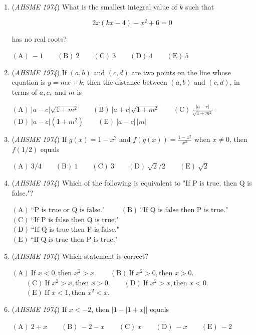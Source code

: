 \begin{enumerate}
	\item (\textit{AHSME 1974}) What is the smallest integral value of $k$ such that 


 
 \[2x(kx-4)-x^2+6=0\]


 has no real roots?


 $\mathrm{(A)\ } -1 \qquad \mathrm{(B) \ }2 \qquad \mathrm{(C) \  } 3 \qquad \mathrm{(D) \  } 4 \qquad \mathrm{(E) \  }5$


	\item (\textit{AHSME 1974}) If $(a, b)$ and $(c, d)$ are two points on the line whose equation is $y=mx+k$, then the distance between $(a, b)$ and $(c, d)$, in terms of $a, c,$ and $m$ is 


 $\mathrm{(A)\ } |a-c|\sqrt{1+m^2} \qquad \mathrm{(B) \ }|a+c|\sqrt{1+m^2} \qquad \mathrm{(C) \  } \frac{|a-c|}{\sqrt{1+m^2}} \qquad$
$\mathrm{(D) \  } |a-c|(1+m^2) \qquad \mathrm{(E) \  }|a-c|\,|m|$


	\item (\textit{AHSME 1974}) If $g(x)=1-x^2$ and $f(g(x))=\frac{1-x^2}{x^2}$ when $x\not=0$, then $f(1/2)$ equals 


 $\mathrm{(A)\ } 3/4 \qquad \mathrm{(B) \ }1 \qquad \mathrm{(C) \  } 3 \qquad \mathrm{(D) \  } \sqrt{2}/2 \qquad \mathrm{(E) \  }\sqrt{2}$


	\item (\textit{AHSME 1974}) Which of the following is equivalent to "If P is true, then Q is false."?


 $\mathrm{(A)\ } \text{``P is true or Q is false."} \qquad$
$\mathrm{(B) \ }\text{``If Q is false then P is true."} \qquad$
$\mathrm{(C) \  } \text{``If P is false then Q is true."} \qquad$
$\mathrm{(D) \  } \text{``If Q is true then P is false."} \qquad$
$\mathrm{(E) \  }\text{``If Q is true then P is true."} \qquad$


	\item (\textit{AHSME 1974}) Which statement is correct?


 $\mathrm{(A)\ } \text{If } x<0, \text{then } x^2>x. \qquad \mathrm{(B) \ } \text{If } x^2>0, \text{then } x>0.$
$\qquad \mathrm{(C) \  } \text{If } x^2>x, \text{then } x>0. \qquad \mathrm{(D) \  } \text{If } x^2>x, \text{then } x<0.$
$\qquad \mathrm{(E) \  }\text{If } x<1, \text{then } x^2<x.$


	\item (\textit{AHSME 1974}) If $x<-2$, then $|1-|1+x||$ equals 


 $\mathrm{(A)\ } 2+x \qquad \mathrm{(B) \ }-2-x \qquad \mathrm{(C) \  } x \qquad \mathrm{(D) \  } -x \qquad \mathrm{(E) \  }-2$



\end{enumerate}
